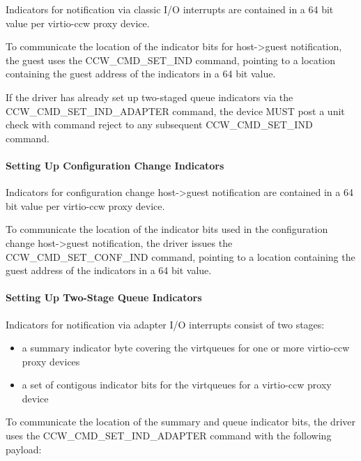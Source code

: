 Indicators for notification via classic I/O interrupts are contained
in a 64 bit value per virtio-ccw proxy device.

To communicate the location of the indicator bits for host->guest
notification, the guest uses the CCW_CMD_SET_IND command,
pointing to a location containing the guest address of the
indicators in a 64 bit value.

If the driver has already set up two-staged queue indicators via the
CCW_CMD_SET_IND_ADAPTER command, the device MUST post a unit check
with command reject to any subsequent CCW_CMD_SET_IND command.

\paragraph{Setting Up Configuration Change Indicators}\label{sec:Virtio Transport Options / Virtio over channel I/O / Device Initialization / Setting Up Indicators / Setting Up Configuration Change Indicators}

Indicators for configuration change host->guest notification are
contained in a 64 bit value per virtio-ccw proxy device.

To communicate the location of the indicator bits used in the
configuration change host->guest notification, the driver issues the
CCW_CMD_SET_CONF_IND command, pointing to a location containing the
guest address of the indicators in a 64 bit value.

\paragraph{Setting Up Two-Stage Queue Indicators}\label{sec:Virtio Transport Options / Virtio over channel I/O / Device Initialization / Setting Up Indicators / Setting Up Two-Stage Queue Indicators}

Indicators for notification via adapter I/O interrupts consist of
two stages:
\begin{itemize}
\item a summary indicator byte covering the virtqueues for one or more
  virtio-ccw proxy devices
\item a set of contigous indicator bits for the virtqueues for a
  virtio-ccw proxy device
\end{itemize}

To communicate the location of the summary and queue indicator bits,
the driver uses the CCW_CMD_SET_IND_ADAPTER command with the following
payload:

